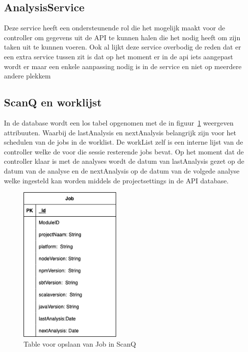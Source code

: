 \subsection{AnalysisService}\label{subsec:analysisservice}
Deze service heeft een ondersteunende rol die het mogelijk maakt voor de controller om gegevens uit de API te kunnen halen die het nodig heeft om  zijn taken uit te kunnen voeren. Ook al lijkt deze service overbodig de reden dat er een extra service tussen zit is dat op het moment er in de api iets aangepast wordt er maar een enkele aanpassing nodig is in de service en niet op meerdere andere plekkem

\subsection{ScanQ en worklijst}\label{subsec:scanq}
In de database wordt een los tabel opgenomen met de in figuur~\ref{fig:scanQERD} weergeven attribuuten. Waarbij de lastAnalysis en nextAnalysis belangrijk zijn voor het schedulen van de jobs in de worklist.
De workList zelf is een interne lijst van de controller welke de voor die sessie resterende jobs bevat. Op het moment dat de controller klaar is met de analyses wordt de datum van lastAnalysis gezet op de datum van de analyse en de nextAnalysis op de datum van de volgede analyse welke ingesteld kan worden middels de projectsettings in de API database.
\begin{figure}[bth]
    \myfloatalign
    \includegraphics[width=5cm]{gfx/SOUPAPI-scanQERD}
    \caption{Table voor opslaan van Job in ScanQ}
    \label{fig:scanQERD}
\end{figure}
